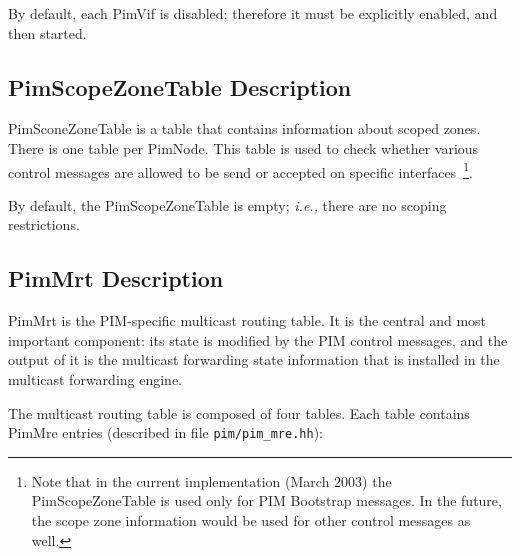 \documentclass[11pt]{article}
\newcommand{\ie}{\emph{i.e.,}\xspace}
\begin{document}
By default, each PimVif is disabled; therefore it must be explicitly
enabled, and then started.


\subsection{PimScopeZoneTable Description}

PimSconeZoneTable is a table that contains information about scoped
zones. There is one table per PimNode. This table is used to check
whether various control messages are allowed to be send or accepted on
specific interfaces~\footnote{Note that in the current implementation
(March 2003) the PimScopeZoneTable is used only for PIM
Bootstrap messages. In the future, the scope zone information would be
used for other control messages as well.}.

By default, the PimScopeZoneTable is empty; \ie there are no scoping
restrictions.


\subsection{PimMrt Description}

PimMrt is the PIM-specific multicast routing table. It is the central
and most important component: its state is modified by the PIM control
messages, and the output of it is the multicast forwarding state
information that is installed in the multicast forwarding engine.

The multicast routing table is composed of four tables. Each table
contains PimMre entries (described in file \verb=pim/pim_mre.hh=):
\end{document}

